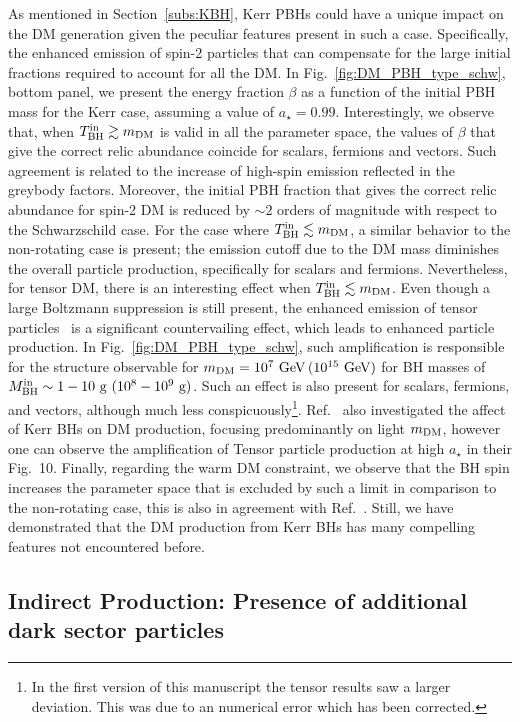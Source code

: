 \documentclass[aps,prd,reprint,twocolumn,preprintnumbers,floatfix,nofootinbib]{revtex4-1}
\newcommand{\MBH}{M_{\rm BH}}
\newcommand{\TBHi}{T_{\rm BH}^{\rm in}}
\newcommand{\as}{a_\star}
\newcommand{\GeV}{\rm GeV}
\newcommand{\g}{\rm g}
\begin{document}
As mentioned in Section~\ref{subs:KBH}, Kerr PBHs could have a unique impact on the DM generation given the peculiar features present in such a case. Specifically, the enhanced emission of spin-2 particles that can compensate for the large initial fractions required to account for all the DM. In Fig.~\ref{fig:DM_PBH_type_schw}, bottom panel, we present the energy fraction $\beta$ as a function of the initial PBH mass for the Kerr case, assuming a value of $\as = 0.99$. Interestingly, we observe that, when $\TBHi \gtrsim m_{\rm DM}$ is valid in all the parameter space, the values of $\beta$ that give the correct relic abundance coincide for scalars, fermions and vectors. Such agreement is related to the increase of high-spin emission reflected in the greybody factors.
Moreover, the initial PBH fraction that gives the correct relic abundance for spin-2 DM is reduced by $\sim 2$ orders of magnitude with respect to the Schwarzschild case. For the case where $\TBHi \lesssim m_{\rm DM}$, a similar behavior to the non-rotating case is present; the emission cutoff due to the DM mass diminishes the overall particle production, specifically for scalars and fermions. Nevertheless, for tensor DM, there is an interesting effect when $\TBHi \lesssim m_{\rm DM}$. Even though a large Boltzmann suppression is still present, the enhanced emission of tensor particles~\cite{Dong:2015yjs} is a significant countervailing effect, which leads to enhanced particle production. In Fig.~\ref{fig:DM_PBH_type_schw}, such amplification is responsible for the structure observable for $m_{\rm DM} = 10^7~\GeV\,(10^{15}~\GeV)$ for BH masses of $\MBH^{\rm in} \sim 1 - 10~{\g}~(10^{8} - 10^{9}~{\g})$. Such an effect is also present for scalars, fermions, and vectors, although much less conspicuously\footnote{In the first version of this manuscript the tensor results saw a larger deviation. This was due to an numerical error which has been corrected.}. Ref.~\cite{Masina:2021zpu} also investigated the affect of Kerr BHs on DM production, focusing predominantly on light $m_{\rm DM}$, however one can observe the amplification of Tensor particle production at high $a_{\star}$ in their Fig.~10. Finally, regarding the warm DM constraint, we observe that the BH spin increases the parameter space that is excluded by such a limit in comparison to the non-rotating case, this is also in agreement with Ref.~\cite{Masina:2021zpu}. Still, we have demonstrated that the DM production from Kerr BHs has many compelling features not encountered before.

\subsection{Indirect Production: Presence of additional dark sector particles}\label{subsec:ind}
\end{document}
